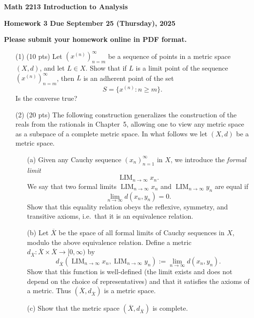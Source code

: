 \documentclass[12pt]{amsart}
\theoremstyle{definition}
\theoremstyle{remark}
\begin{document}
\begin{CJK}{UTF8}{bkai}

{\centerline{\bf Math 2213 Introduction to Analysis  }}

{\centerline{\bf Homework 3  Due   September 25 (Thursday), 2025}}

{\centerline{\bf Please submit your homework online in PDF format.}}


 
\begin{enumerate}

\item[(1)]  (10 pts)  Let $(x^{(n)})_{n=m}^\infty$ be a sequence of points in a metric space $(X,d)$, and let $L\in X$. Show that if $L$ is a limit point of the sequence $(x^{(n)})_{n=m}^\infty$, then $L$ is an adherent point of the set
\[
S = \{ x^{(n)} : n\ge m \}.
\]
Is the converse true?


\bigskip


\item[(2)]  (20 pts) 
The following construction generalizes the construction of the reals from the rationals in Chapter~5, allowing one to view any metric space as a subspace of a complete metric space. In what follows we let $(X,d)$ be a metric space.
\begin{enumerate}
  \item[(a)] Given any Cauchy sequence $(x_n)_{n=1}^\infty$ in $X$, we introduce the \emph{formal limit} 
  \[
  \operatorname{LIM}_{n\to\infty} x_n.
  \]
  We say that two formal limits $\operatorname{LIM}_{n\to\infty} x_n$ and $\operatorname{LIM}_{n\to\infty} y_n$ are equal if 
  \[
  \lim_{n\to\infty} d(x_n,y_n) = 0.
  \]
  Show that this equality relation obeys the reflexive, symmetry, and transitive axioms, i.e.\ that it is an equivalence relation.

  \item[(b)] Let $\overline{X}$ be the space of all formal limits of Cauchy sequences in $X$, modulo the above equivalence relation. Define a metric $d_{\overline{X}}:\overline{X}\times\overline{X}\to [0,\infty)$ by
  \[
  d_{\overline{X}}\!\left(\operatorname{LIM}_{n\to\infty}x_n, \operatorname{LIM}_{n\to\infty} y_n\right) := \lim_{n\to\infty} d(x_n,y_n).
  \]
  Show that this function is well-defined (the limit exists and does not depend on the choice of representatives) and that it satisfies the axioms of a metric. Thus $(\overline{X},d_{\overline{X}})$ is a metric space.

  \item[(c)] Show that the metric space $(\overline{X},d_{\overline{X}})$ is complete.


\end{enumerate}
\end{enumerate}
\end{CJK}
\end{document}
